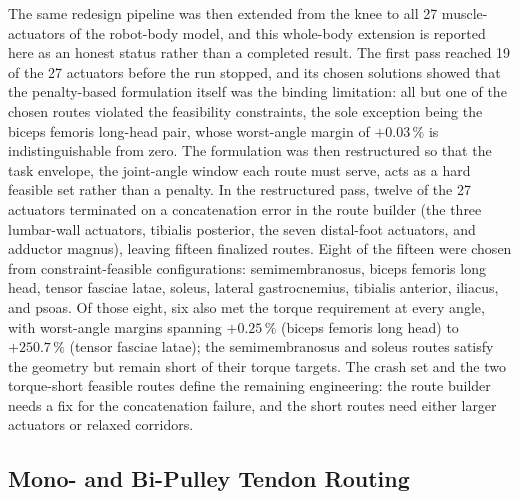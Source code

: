 The same redesign pipeline was then extended from the knee to all 27 muscle-actuators of the robot-body model, and this whole-body extension is reported here as an honest status rather than a completed result. The first pass reached 19 of the 27 actuators before the run stopped, and its chosen solutions showed that the penalty-based formulation itself was the binding limitation: all but one of the chosen routes violated the feasibility constraints, the sole exception being the biceps femoris long-head pair, whose worst-angle margin of $+0.03\,\%$ is indistinguishable from zero. The formulation was then restructured so that the task envelope, the joint-angle window each route must serve, acts as a hard feasible set rather than a penalty. In the restructured pass, twelve of the 27 actuators terminated on a concatenation error in the route builder (the three lumbar-wall actuators, tibialis posterior, the seven distal-foot actuators, and adductor magnus), leaving fifteen finalized routes. Eight of the fifteen were chosen from constraint-feasible configurations: semimembranosus, biceps femoris long head, tensor fasciae latae, soleus, lateral gastrocnemius, tibialis anterior, iliacus, and psoas. Of those eight, six also met the torque requirement at every angle, with worst-angle margins spanning $+0.25\,\%$ (biceps femoris long head) to $+250.7\,\%$ (tensor fasciae latae); the semimembranosus and soleus routes satisfy the geometry but remain short of their torque targets. The crash set and the two torque-short feasible routes define the remaining engineering: the route builder needs a fix for the concatenation failure, and the short routes need either larger actuators or relaxed corridors.

\subsection{Mono- and Bi-Pulley Tendon Routing}\label{sec:disc_pulley}


